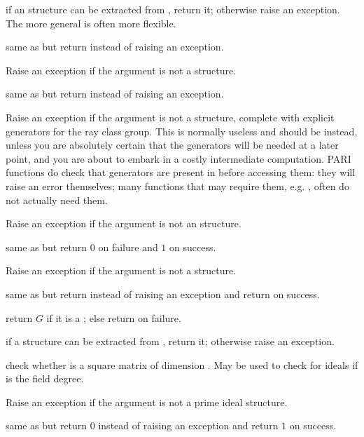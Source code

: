  if an  structure can be extracted from
, return it; otherwise raise an exception. The more general
 is often more flexible.

 same as  but return 
instead of raising an exception.

 Raise an exception if the argument
is not a  structure.

 same as  but return 
instead of raising an exception.

 Raise an exception if the argument is not a
 structure, complete with explicit generators for the ray class group.
This is normally useless and  should be instead, unless
you are absolutely certain that the generators will be needed at a later
point, and you are about to embark in a costly intermediate computation.
PARI functions do check that generators are present in  before
accessing them: they will raise an error themselves; many functions
that may require them, e.g. , often
do not actually need them.

 Raise an exception if the argument is not an
 structure.

 same as  but return $0$
on failure and $1$ on success.

 Raise an exception if the argument is not a
 structure.

 same as  but return 
instead of raising an exception and return  on success.

 return $G$ if it is a ;
else return  on failure.

 if a  structure can be extracted
from , return it; otherwise raise an exception.

 check whether  is a square matrix
of dimension . May be used to check for ideals if  is the field
degree.

 Raise an exception if the argument is not a
prime ideal structure.

 same as  but return $0$
instead of raising an exception and return $1$ on success.

